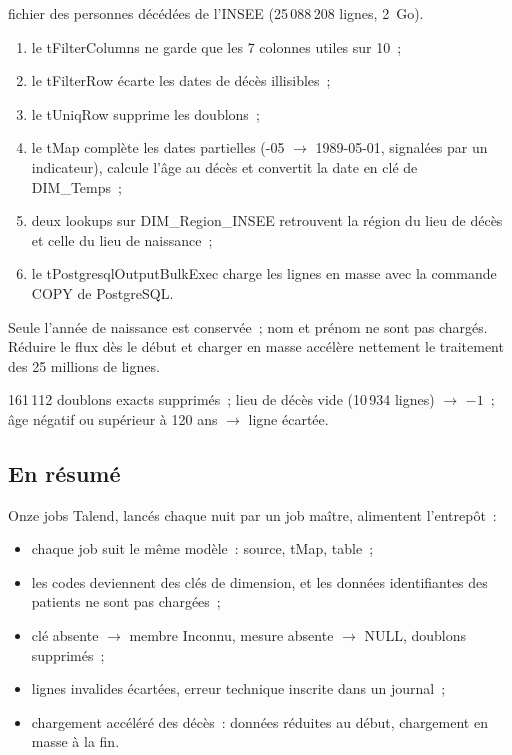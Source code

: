  {fichier des personnes décédées de l'INSEE (25\,088\,208 lignes, 2~Go).}
  {
  \begin{enumerate}
	\item le tFilterColumns ne garde que les 7 colonnes utiles sur 10~;
	\item le tFilterRow écarte les dates de décès illisibles~;
	\item le tUniqRow supprime les doublons~;
	\item le tMap complète les dates partielles (-05\fg{} $\rightarrow$ 1989-05-01, signalées par un indicateur), calcule l'âge au décès et convertit la date en clé de DIM\_Temps~;
	\item deux lookups sur DIM\_Region\_INSEE retrouvent la région du lieu de décès et celle du lieu de naissance~;
	\item le tPostgresqlOutputBulkExec charge les lignes en masse avec la commande COPY de PostgreSQL.
  \end{enumerate}

  \vspace{0.1cm}\noindent Seule l'année de naissance est conservée~; nom et prénom ne sont pas chargés. Réduire le flux dès le début et charger en masse accélère nettement le traitement des 25 millions de lignes.}
  {161\,112 doublons exacts supprimés~; lieu de décès vide (10\,934 lignes) $\rightarrow$ $-1$~; âge négatif ou supérieur à 120 ans $\rightarrow$ ligne écartée.}

\subsection*{En résumé}

\noindent Onze jobs Talend, lancés chaque nuit par un job maître, alimentent l'entrepôt~:
\begin{itemize}
	\item chaque job suit le même modèle~: source, tMap, table~;
	\item les codes deviennent des clés de dimension, et les données identifiantes des patients ne sont pas chargées~;
	\item clé absente $\rightarrow$ membre \og Inconnu\fg{}, mesure absente $\rightarrow$ NULL, doublons supprimés~;
	\item lignes invalides écartées, erreur technique inscrite dans un journal~;
	\item chargement accéléré des décès~: données réduites au début, chargement en masse à la fin.
\end{itemize}


